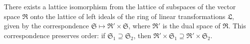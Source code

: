 There exists a lattice isomorphism from the lattice of subspaces of the vector space $\mathfrak{R}$ onto the lattice of left ideals of the ring of linear transformations $\mathfrak{L}$, given by the correspondence $\mathfrak{S} \mapsto \mathfrak{R}' \times \mathfrak{S}$, where $\mathfrak{R}'$ is the dual space of $\mathfrak{R}$. This correspondence preserves order: if $\mathfrak{S}_1 \supseteq \mathfrak{S}_2$, then $\mathfrak{R}' \times \mathfrak{S}_1 \supseteq \mathfrak{R}' \times \mathfrak{S}_2$.
